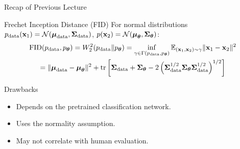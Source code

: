 \documentclass{beamer}
\begin{document}
\begin{frame}{Recap of Previous Lecture}
	\vspace{-0.3cm}
	\begin{block}{Frechet Inception Distance (FID)}
		For normal distributions $p_{\text{data}}(\mathbf{x}_1) = \mathcal{N}(\boldsymbol{\mu}_{\text{data}}, \boldsymbol{\Sigma}_{\text{data}})$, $p(\mathbf{x}_2) = \mathcal{N}(\boldsymbol{\mu}_{\boldsymbol{\theta}}, \boldsymbol{\Sigma}_{\boldsymbol{\theta}})$:
		\vspace{-0.3cm}
		\begin{multline*}
			\mathrm{FID} (p_{\text{data}}, p_{\boldsymbol{\theta}}) =  W_2^2(p_{\text{data}} \| p_{\boldsymbol{\theta}}) = \inf_{\gamma \in \Gamma(p_{\text{data}}, p_{\boldsymbol{\theta}})} \mathbb{E}_{(\mathbf{x}_1, \mathbf{x}_2) \sim \gamma} \| \mathbf{x}_1 - \mathbf{x}_2 \|^2 \\
			= \| \boldsymbol{\mu}_{\text{data}} - \boldsymbol{\mu}_{\boldsymbol{\theta}}\|^2 + \operatorname{tr} \left[ \boldsymbol{\Sigma}_{\text{data}} + \boldsymbol{\Sigma}_{\boldsymbol{\theta}} - 2 \left(\boldsymbol{\Sigma}_{\text{data}}^{1/2} \boldsymbol{\Sigma}_{\boldsymbol{\theta}} \boldsymbol{\Sigma}_{\text{data}}^{1/2} \right)^{1/2} \right]
		\end{multline*}
		\vspace{-0.4cm}
	\end{block}
	\begin{block}{Drawbacks}
		\begin{itemize}
			\item Depends on the pretrained classification network.
			\item Uses the normality assumption.
			\item May not correlate with human evaluation.
		\end{itemize}
	\end{block}
\end{frame}
\end{document}
